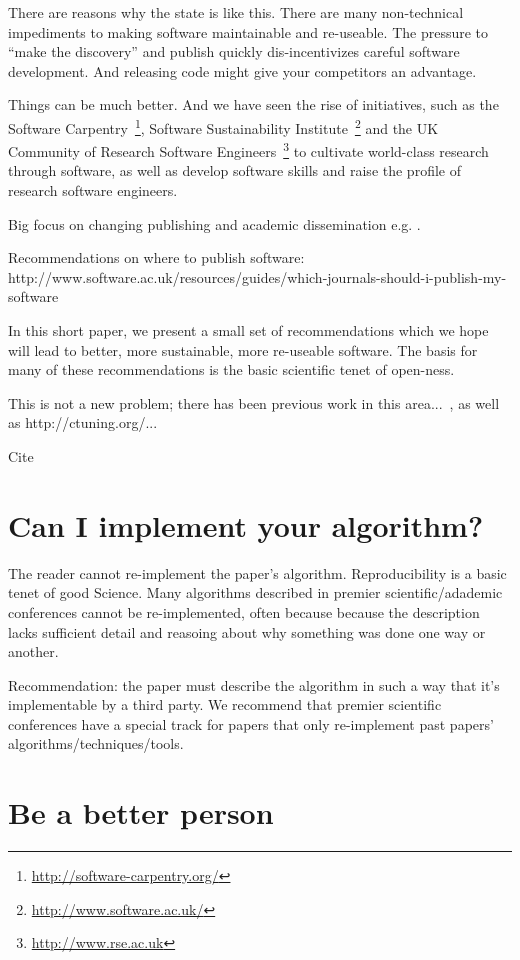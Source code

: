 \documentclass[conference]{IEEEtran}
\begin{document}
There are reasons why the state is like this. There are many
non-technical impediments to making software maintainable and
re-useable. The pressure to ``make the discovery'' and publish quickly
dis-incentivizes careful software development. And releasing code
might give your competitors an advantage.

Things can be much better. And we have seen the rise of initiatives,
such as the Software
Carpentry~\footnote{\url{http://software-carpentry.org/}}, Software
Sustainability Institute~\footnote{\url{http://www.software.ac.uk/}}
and the UK Community of Research Software
Engineers~\footnote{\url{http://www.rse.ac.uk}} to cultivate
world-class research through software, as well as develop software
skills and raise the profile of research software engineers.

Big focus on changing publishing and academic dissemination
e.g. \cite{stodden-et-al:2013,fursin+dubach:2014}.

Recommendations on where to publish software:
http://www.software.ac.uk/resources/guides/which-journals-should-i-publish-my-software


In this short paper, we present a small set of recommendations which
we hope will lead to better, more sustainable, more re-useable
software. The basis for many of these recommendations is the basic
scientific tenet of open-ness.

This is not a new problem; there has been previous work in this
area...~\cite{sim-et-al:2003,chirigati-et-al:2013}, as well as http://ctuning.org/...

Cite~\cite{collberg-et-al:2014}


\section{Can I implement your algorithm?}
The reader cannot re-implement the paper's algorithm. Reproducibility
is a basic tenet of good Science. Many algorithms described in premier
scientific/adademic conferences cannot be re-implemented, often
because because the description lacks sufficient detail and reasoing
about why something was done one way or another.

Recommendation: the paper must describe the algorithm in such a way
that it's implementable by a third party. We recommend that premier
scientific conferences have a special track for papers that only
re-implement past papers' algorithms/techniques/tools.


\section{Be a better person}
\end{document}
